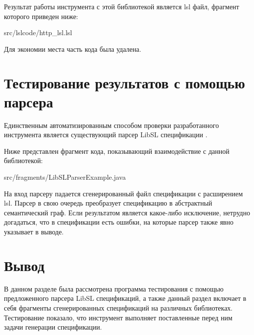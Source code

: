 Результат работы инструмента с этой библиотекой является lsl файл, фрагмент которого приведен ниже:

{src/lslcode/http_lsl.lsl}

Для экономии места часть кода была удалена.

\section{Тестирование результатов с помощью парсера}

Единственным автоматизированным способом проверки разработанного инструмента является существующий парсер LibSL спецификации \cite{libsl_parser}.

Ниже представлен фрагмент кода, показывающий взаимодействие с данной библиотекой:

{src/fragments/LibSLParserExample.java}

На вход парсеру падается сгенерированный файл спецификации с расширением lsl. Парсер в свою очередь преобразует спецификацию в абстрактный семантический граф.
Если результатом является какое-либо исключение, нетрудно догадаться, что в спецификации есть ошибки, на которые парсер также явно указывает в выводе.

\section{Вывод}

В данном разделе была рассмотрена программа тестирования с помощью предложенного парсера LibSL спецификаций, а также данный раздел включает в себя фрагменты сгенерированных спецификаций на различных библиотеках.
Тестирование показало, что инструмент выполняет поставленные перед ним задачи генерации спецификации.

